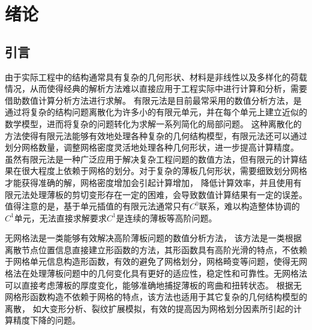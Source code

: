 \chapter{绪论}
\section{引言}
由于实际工程中的结构通常具有复杂的几何形状、材料是非线性以及多样化的荷载情况，从而使得经典的解析方法难以直接应用于工程实际中进行计算和分析，需要借助数值计算分析方法进行求解。
有限元法\textsuperscript{\cite{hughes2000,2014Computer,steinEncyclopediaComputationalMechanics2018,2013Nonlinear}}是目前最常采用的数值分析方法，是通过将复杂的结构问题离散化为许多小的有限元单元，并在每个单元上建立近似的数学模型，进而将复杂的问题转化为求解一系列简化的局部问题。
这种离散化的方法使得有限元法能够有效地处理各种复杂的几何结构模型，有限元法还可以通过划分网格数量，调整网格密度灵活地处理各种几何形状，进一步提高计算精度。
虽然有限元法是一种广泛应用于解决复杂工程问题的数值方法，但有限元的计算结果在很大程度上依赖于网格的划分。对于复杂的薄板几何形状，需要细致划分网格才能获得准确的解，网格密度增加会引起计算增加， 降低计算效率，并且使用有限元法处理薄板的剪切变形存在一定的困难，会导致数值计算结果有一定的误差。
值得注意的是，基于单元插值的有限元法通常只有$C^0$联系，难以构造整体协调的$C^1$单元，无法直接求解要求$C^1$是连续的薄板等高阶问题。
\par
无网格法\textsuperscript{\cite{chenMeshfreeMethodsProgress2017,belytschkoMeshlessMethodsOverview1996b}}是一类能够有效解决高阶薄板问题的数值分析方法，
该方法是一类根据离散节点位置信息直接建立形函数的方法，其形函数具有高阶光滑的特点，不依赖于网格单元信息构造形函数，有效的避免了网格划分，网格畸变等问题，使得无网格法在处理薄板问题\textsuperscript{\cite{邓立克2019薄板分析的线性基梯度光滑伽辽金无网格法}}中的几何变化具有更好的适应性，稳定性和可靠性。无网格法可以直接考虑薄板的厚度变化，能够准确地捕捉薄板的弯曲和扭转状态。
根据无网格形函数构造不依赖于网格的特点，该方法也适用于其它复杂的几何结构模型的离散，
如大变形分析\textsuperscript{\cite{陈嵩涛2020几何非线性分析的高效高阶无网格法}}、裂纹扩展模拟\textsuperscript{\cite{GaoXin2018}}，有效的提高因为网格划分因素所引起的计算精度下降的问题。

